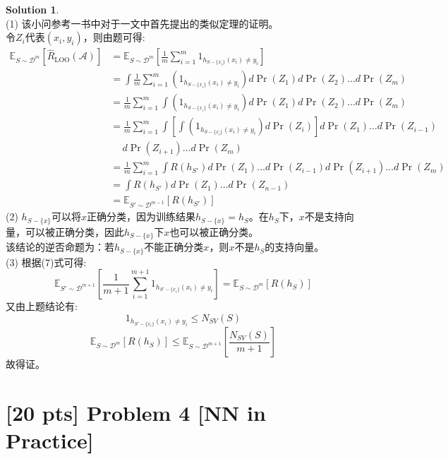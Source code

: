 \documentclass[a4paper,UTF8]{article}
\theoremstyle{definition}
\newtheorem*{solution}{Solution}
\begin{document}
\begin{solution}
~\\(1) 该小问参考\cite{10.5555/572351}一书中对于\cite{Luntz1969OnEo}一文中首先提出的类似定理的证明。
\\令$Z_i$代表$(x_i,y_i)$，则由题可得:
	\begin{equation}\nonumber	
	\begin{aligned}
\mathbb{E}_{S \sim \mathcal{D}^m} \left[\hat{R}_{\text{LOO}}(\mathcal{A})\right] &= \mathbb{E}_{S \sim \mathcal{D}^m} \left[\frac{1}{m} \sum_{i=1}^m 1_{ h_{ S-\{x_i\} } (x_i) \neq y_i }\right] \\&= \int \frac{1}{m} \sum_{i=1}^m \left(1_{ h_{ S-\{x_i\} } (x_i) \neq y_i }\right) d\Pr(Z_1)d\Pr(Z_2)\dots d\Pr(Z_m) \\&= \frac{1}{m} \sum_{i=1}^m \int \left(1_{ h_{ S-\{x_i\} } (x_i) \neq y_i }\right) d\Pr(Z_1)d\Pr(Z_2)\dots d\Pr(Z_m)\\&= \frac{1}{m} \sum_{i=1}^m \int \left[\int\left(1_{ h_{ S-\{x_i\} } (x_i) \neq y_i }\right)d\Pr(Z_i)\right] d\Pr(Z_1)\dots d\Pr(Z_{i-1})\\&\quad\ d\Pr(Z_{i+1})\dots d\Pr(Z_m)\\& = \frac{1}{m} \sum_{i=1}^m \int R(h_{S'}) d\Pr(Z_1)\dots d\Pr(Z_{i-1})d\Pr(Z_{i+1})\dots d\Pr(Z_m)\\&= \int R(h_{S'}) d\Pr(Z_1)\dots d\Pr(Z_{n-1})\\&= \mathbb{E}_{S' \sim \mathcal{D}^{m-1}} [ R(h_{S'}) ]
	\end{aligned}
	\end{equation}
 (2) $h_{S-\{x\}}$可以将$x$正确分类，因为训练结果$h_{S-\{x\}} = h_S$。在$h_S$下，$x$不是支持向量，可以被正确分类，因此$h_{S-\{x\}}$下$x$也可以被正确分类。
 \\该结论的逆否命题为：若$h_{S-\{x\}}$不能正确分类$x$，则$x$不是$h_S$的支持向量。 
 \\(3) 根据(7)式可得:
 $$\mathbb{E}_{S' \sim \mathcal{D}^{m+1}} [\frac{1}{m+1} \sum_{i=1}^{m+1} 1_{ h_{ S'-\{x_i\} } (x_i) \neq y_i }] = \mathbb{E}_{S \sim \mathcal{D}^{m}} [ R(h_{S}) ] $$
 又由上题结论有:
 $$1_{ h_{ S'-\{x_i\} } (x_i) \neq y_i } \leqslant N_{SV}(S)$$
 $$\mathbb{E}_{S \sim \mathcal{D}^m}[ R(h_S) ] \leqslant \mathbb{E}_{S \sim \mathcal{D}^{m+1}} \left[ \frac{N_{SV}(S)}{m+1} \right]$$
 故得证。
\end{solution}

\section*{[20 pts] Problem 4 [NN in Practice]}
\end{document}
